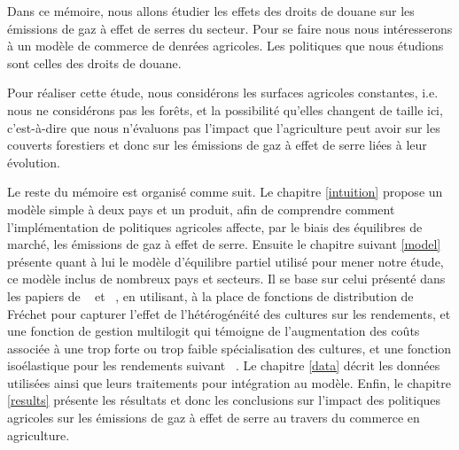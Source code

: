 
Dans ce mémoire, nous allons étudier les effets des droits de douane sur les émissions de gaz à effet de serres du secteur. Pour se faire nous nous intéresserons à un modèle de commerce de denrées agricoles. Les politiques que nous étudions sont celles des droits de douane.




Pour réaliser cette étude, nous considérons les surfaces agricoles constantes, i.e. nous ne considérons pas les forêts, et la possibilité qu’elles changent de taille ici, c’est-à-dire que nous n’évaluons pas l’impact que l’agriculture peut avoir sur les couverts forestiers et donc sur les émissions de gaz à effet de serre liées à leur évolution.

Le reste du mémoire est organisé comme suit. Le chapitre \ref{intuition} propose un modèle simple à deux pays et un produit, afin de comprendre comment l’implémentation de politiques agricoles affecte, par le biais des équilibres de marché, les émissions de gaz à effet de serre. Ensuite le chapitre suivant \ref{model} présente quant à lui le modèle d’équilibre partiel utilisé pour mener notre étude, ce modèle inclus de nombreux pays et secteurs. Il se base sur celui présenté dans les papiers de ~\cite{Gouel2021} et ~\cite{Gouel2025}, en utilisant, à la place de fonctions de distribution de Fréchet pour capturer l’effet de l’hétérogénéité des cultures sur les rendements, et une fonction de gestion multilogit qui témoigne de l’augmentation des coûts associée à une trop forte ou trop faible spécialisation des cultures, et une fonction isoélastique pour les rendements suivant ~\cite{Carpentier2013}. Le chapitre \ref{data} décrit les données utilisées ainsi que leurs traitements pour intégration au modèle. Enfin, le chapitre \ref{results} présente les résultats et donc les conclusions sur l’impact des politiques agricoles sur les émissions de gaz à effet de serre au travers du commerce en agriculture.
